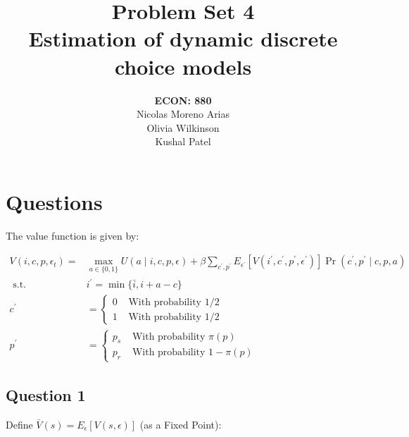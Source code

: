 \documentclass[12pt,english]{article}
\title{\textbf{Problem Set 4}\\Estimation of dynamic discrete choice models}
\author{\textbf{ECON: 880}\\
Nicolas Moreno Arias\\ Olivia Wilkinson\\ Kushal Patel}
\date{}
\begin{document}
\maketitle




\section*{Questions}
The value function is given by:

$$
\begin{aligned}
V\left(i, c, p, \epsilon_{t}\right)= & \max _{a \in\{0,1\}} U(a \mid i, c, p, \epsilon)+\beta \sum_{c^{\prime}, p^{\prime}} E_{\epsilon^{\prime}}\left[V\left(i^{\prime}, c^{\prime}, p^{\prime}, \epsilon^{\prime}\right)\right] \operatorname{Pr}\left(c^{\prime}, p^{\prime} \mid c, p, a\right) \\
\text { s.t. } & i^{\prime}=\min \{\bar{i}, i+a-c\} \\
c^{\prime} & = \begin{cases}0 & \text { With probability } 1 / 2 \\
1 & \text { With probability } 1 / 2\end{cases} \\
p^{\prime} & = \begin{cases}p_{s} & \text { With probability } \pi(p) \\
p_{r} & \text { With probability } 1-\pi(p)\end{cases}
\end{aligned}
$$
\subsection*{Question 1}
Define $\bar{V}(s)=E_{\epsilon}[V(s, \epsilon)]$ (as a Fixed Point):
\end{document}
